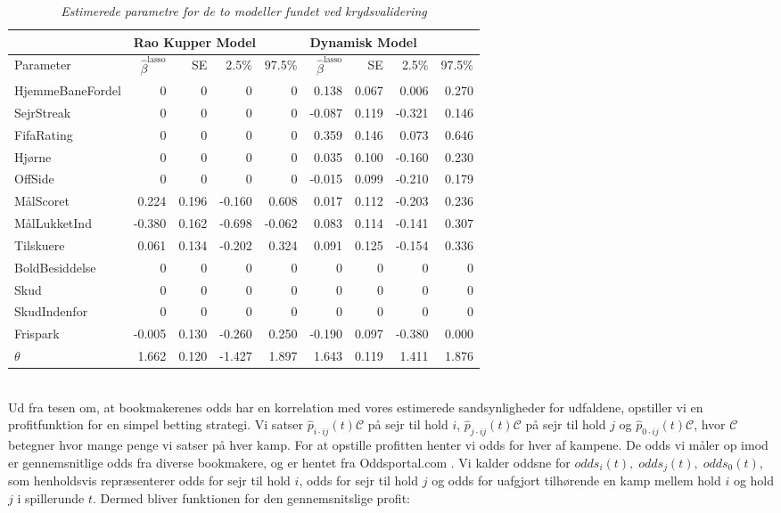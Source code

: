 \documentclass[11pt,a4paper]{article}
\begin{document}
\begin{table}[ht!]
\centering
\begin{adjustbox}{max width=\textwidth}
\begin{tabular}{|l|rrrr|rrrr|}
\hline
\multicolumn{1}{|l|}{} & \multicolumn{4}{l|}{Rao Kupper Model} & \multicolumn{4}{l|}{Dynamisk Model} \\\hline 
Parameter & $\hat{\beta}^{\text{lasso}}$ & SE &2.5\%&97.5\%& $\hat{\beta}^{\text{lasso}}$ & SE&2.5\%&97.5\%\\
 \hline
HjemmeBaneFordel   & 0 & 0 & 0 & 0                 & 0.138  & 0.067 & 0.006 & 0.270\\
SejrStreak         & 0 & 0 & 0 & 0                 & -0.087 & 0.119 & -0.321 & 0.146\\
FifaRating         & 0 & 0 & 0 & 0                 & 0.359 & 0.146  & 0.073 & 0.646 \\
Hjørne             & 0 & 0 & 0 & 0                 & 0.035 & 0.100  & -0.160 & 0.230\\
OffSide            & 0 & 0 & 0 & 0                 & -0.015 & 0.099 & -0.210 & 0.179\\
MålScoret          & 0.224 & 0.196 & -0.160 & 0.608         & 0.017 & 0.112 & -0.203 & 0.236\\
MålLukketInd       & -0.380 & 0.162 & -0.698 & -0.062        & 0.083 & 0.114 & -0.141 & 0.307\\
Tilskuere          & 0.061 & 0.134 & -0.202 & 0.324         & 0.091 & 0.125 & -0.154 & 0.336\\
BoldBesiddelse     & 0 & 0 & 0 & 0                 & 0 & 0 & 0 & 0\\
Skud               & 0 & 0 & 0 & 0                 & 0 & 0 & 0 & 0  \\
SkudIndenfor       & 0 & 0 & 0 & 0                 & 0 & 0 & 0 & 0 \\
Frispark           & -0.005 & 0.130 & -0.260 & 0.250        & -0.190 & 0.097 & -0.380 & 0.000\\
$\theta$           & 1.662 & 0.120 & -1.427 & 1.897         & 1.643 & 0.119 & 1.411 & 1.876\\
   \hline   
\end{tabular} 
\end{adjustbox}
\caption{\label{tab:EstKoefOptLambda}\textit{Estimerede parametre for de to modeller fundet ved krydsvalidering}}
\end{table}\\
Ud fra tesen om, at bookmakerenes odds har en korrelation med vores estimerede sandsynligheder for udfaldene, opstiller vi en profitfunktion for en simpel betting strategi. Vi satser $\hat{p}_{i\cdot ij}(t)\mathcal{C}$ på sejr til hold $i$, $\hat{p}_{j\cdot ij}(t)\mathcal{C}$ på sejr til hold $j$ og $\hat{p}_{0\cdot ij}(t)\mathcal{C}$, hvor $\mathcal{C}$ betegner hvor mange penge vi satser på hver kamp. For at opstille profitten henter vi odds for hver af kampene. De odds vi måler op imod er gennemsnitlige odds fra diverse bookmakere, og er hentet fra Oddsportal.com \cite{Oddsportal}. Vi kalder oddsne for $odds_i(t),\; odds_j(t), \; odds_0(t)$, som henholdsvis repræsenterer odds for sejr til hold $i$, odds for sejr til hold $j$ og odds for uafgjort tilhørende en kamp mellem hold $i$ og hold $j$ i spillerunde $t$. Dermed bliver funktionen for den gennemsnitslige profit:
\end{document}
